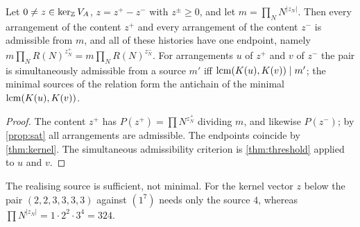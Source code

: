 \begin{theorem}\label{thm:realise}
Let $0\ne z\in\ker_{\mathbb Z}V_A$, $z=z^+-z^-$ with $z^\pm\ge0$, and let $m=\prod_N N^{|z_N|}$. Then every arrangement of the content $z^+$ and every arrangement of the content $z^-$ is admissible from $m$, and all of these histories have one endpoint, namely $m\prod_N R(N)^{z^+_N}=m\prod_N R(N)^{z^-_N}$. For arrangements $u$ of $z^+$ and $v$ of $z^-$ the pair is simultaneously admissible from a source $m'$ iff $\operatorname{lcm}(K(u),K(v))\mid m'$; the minimal sources of the relation form the antichain of the minimal $\operatorname{lcm}(K(u),K(v))$.
\end{theorem}
\begin{proof}
The content $z^+$ has $P(z^+)=\prod N^{z^+_N}$ dividing $m$, and likewise $P(z^-)$; by \cref{prop:sat} all arrangements are admissible. The endpoints coincide by \cref{thm:kernel}. The simultaneous admissibility criterion is \cref{thm:threshold} applied to $u$ and $v$.
\end{proof}
The realising source is sufficient, not minimal. For the kernel vector $z$ below the pair $(2,2,3,3,3,3)$ against $(1^7)$ needs only the source $4$, whereas $\prod N^{|z_N|}=1\cdot2^2\cdot3^4=324$.

